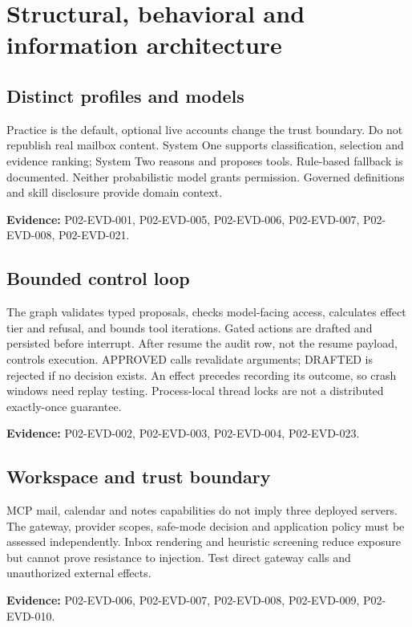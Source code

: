 \documentclass[10pt,letterpaper]{article}
\begin{document}
\section{Structural, behavioral and information architecture}
\subsection{Distinct profiles and models}
Practice is the default, optional live accounts change the trust boundary. Do not republish real mailbox content. System One supports classification, selection and evidence ranking; System Two reasons and proposes tools. Rule-based fallback is documented. Neither probabilistic model grants permission. Governed definitions and skill disclosure provide domain context.\par\textbf{Evidence:} P02-EVD-001, P02-EVD-005, P02-EVD-006, P02-EVD-007, P02-EVD-008, P02-EVD-021.\par

\subsection{Bounded control loop}
The graph validates typed proposals, checks model-facing access, calculates effect tier and refusal, and bounds tool iterations. Gated actions are drafted and persisted before interrupt. After resume the audit row, not the resume payload, controls execution. APPROVED calls revalidate arguments; DRAFTED is rejected if no decision exists. An effect precedes recording its outcome, so crash windows need replay testing. Process-local thread locks are not a distributed exactly-once guarantee.\par\textbf{Evidence:} P02-EVD-002, P02-EVD-003, P02-EVD-004, P02-EVD-023.\par

\subsection{Workspace and trust boundary}
MCP mail, calendar and notes capabilities do not imply three deployed servers. The gateway, provider scopes, safe-mode decision and application policy must be assessed independently. Inbox rendering and heuristic screening reduce exposure but cannot prove resistance to injection. Test direct gateway calls and unauthorized external effects.\par\textbf{Evidence:} P02-EVD-006, P02-EVD-007, P02-EVD-008, P02-EVD-009, P02-EVD-010.\par
\end{document}
